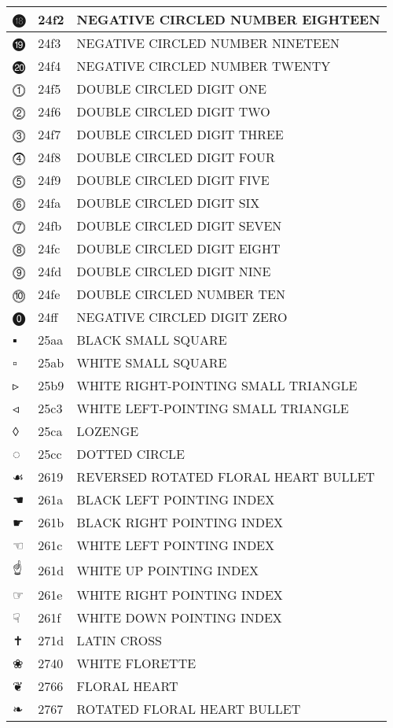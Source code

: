 \documentclass[12pt,letterpaper,openany]{book}
\begin{document}
\begin{center}
\begin{supertabular}{|m{0.25in}|m{0.5in}|m{4in}|}
⓲ & 24f2 & NEGATIVE CIRCLED NUMBER EIGHTEEN\\\hline
⓳ & 24f3 & NEGATIVE CIRCLED NUMBER NINETEEN\\\hline
⓴ & 24f4 & NEGATIVE CIRCLED NUMBER TWENTY\\\hline
⓵ & 24f5 & DOUBLE CIRCLED DIGIT ONE\\\hline
⓶ & 24f6 & DOUBLE CIRCLED DIGIT TWO\\\hline
⓷ & 24f7 & DOUBLE CIRCLED DIGIT THREE\\\hline
⓸ & 24f8 & DOUBLE CIRCLED DIGIT FOUR\\\hline
⓹ & 24f9 & DOUBLE CIRCLED DIGIT FIVE\\\hline
⓺ & 24fa & DOUBLE CIRCLED DIGIT SIX\\\hline
⓻ & 24fb & DOUBLE CIRCLED DIGIT SEVEN\\\hline
⓼ & 24fc & DOUBLE CIRCLED DIGIT EIGHT\\\hline
⓽ & 24fd & DOUBLE CIRCLED DIGIT NINE\\\hline
⓾ & 24fe & DOUBLE CIRCLED NUMBER TEN\\\hline
⓿ & 24ff & NEGATIVE CIRCLED DIGIT ZERO\\\hline
▪ & 25aa & BLACK SMALL SQUARE\\\hline
▫ & 25ab & WHITE SMALL SQUARE\\\hline
▹ & 25b9 & WHITE RIGHT-POINTING SMALL TRIANGLE\\\hline
◃ & 25c3 & WHITE LEFT-POINTING SMALL TRIANGLE\\\hline
◊ & 25ca & LOZENGE\\\hline
◌ & 25cc & DOTTED CIRCLE\\\hline
☙ & 2619 & REVERSED ROTATED FLORAL HEART BULLET\\\hline
☚ & 261a & BLACK LEFT POINTING INDEX\\\hline
☛ & 261b & BLACK RIGHT POINTING INDEX\\\hline
☜ & 261c & WHITE LEFT POINTING INDEX\\\hline
☝ & 261d & WHITE UP POINTING INDEX\\\hline
☞ & 261e & WHITE RIGHT POINTING INDEX\\\hline
☟ & 261f & WHITE DOWN POINTING INDEX\\\hline
✝ & 271d & LATIN CROSS\\\hline
❀ & 2740 & WHITE FLORETTE\\\hline
❦ & 2766 & FLORAL HEART\\\hline
❧ & 2767 & ROTATED FLORAL HEART BULLET\\\hline

\end{supertabular}
\end{center}
\end{document}
